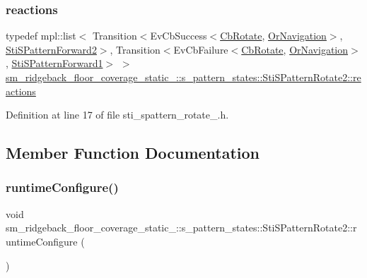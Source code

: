 \subsubsection{\texorpdfstring{reactions}{reactions}}
{\footnotesize\ttfamily typedef mpl\+::list$<$ Transition$<$Ev\+Cb\+Success$<$\hyperlink{classcl__move__base__z_1_1CbRotate}{Cb\+Rotate}, \hyperlink{classsm__ridgeback__floor__coverage__static__1_1_1OrNavigation}{Or\+Navigation}$>$, \hyperlink{structsm__ridgeback__floor__coverage__static__1_1_1s__pattern__states_1_1StiSPatternForward2}{Sti\+S\+Pattern\+Forward2}$>$, Transition$<$Ev\+Cb\+Failure$<$\hyperlink{classcl__move__base__z_1_1CbRotate}{Cb\+Rotate}, \hyperlink{classsm__ridgeback__floor__coverage__static__1_1_1OrNavigation}{Or\+Navigation}$>$, \hyperlink{structsm__ridgeback__floor__coverage__static__1_1_1s__pattern__states_1_1StiSPatternForward1}{Sti\+S\+Pattern\+Forward1}$>$ $>$ \hyperlink{structsm__ridgeback__floor__coverage__static__1_1_1s__pattern__states_1_1StiSPatternRotate2_a7a279f7fc1f6de39d9e97cd41e0f3f32}{sm\+\_\+ridgeback\+\_\+floor\+\_\+coverage\+\_\+static\+\_\+::s\+\_\+pattern\+\_\+states\+::\+Sti\+S\+Pattern\+Rotate2\+::reactions}}



Definition at line 17 of file sti\+\_\+spattern\+\_\+rotate\+\_.\+h.



\subsection{Member Function Documentation}
\mbox{\label{structsm__ridgeback__floor__coverage__static__1_1_1s__pattern__states_1_1StiSPatternRotate2_a2d536059bed60c2f5bd961eafe985f13}} 
\subsubsection{\texorpdfstring{runtime\+Configure()}{runtimeConfigure()}}
{\footnotesize\ttfamily void sm\+\_\+ridgeback\+\_\+floor\+\_\+coverage\+\_\+static\+\_\+::s\+\_\+pattern\+\_\+states\+::\+Sti\+S\+Pattern\+Rotate2\+::runtime\+Configure (\begin{DoxyParamCaption}{ }\end{DoxyParamCaption})\hspace{0.3cm}{\ttfamily [inline]}}



